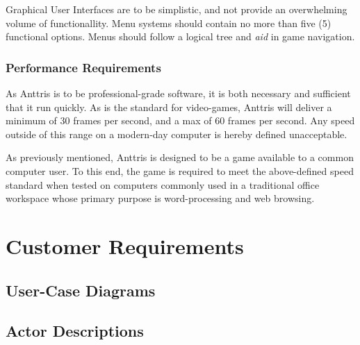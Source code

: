 \documentclass[12pt]{article}
\begin{document}
Graphical User Interfaces are to be simplistic, and not provide an overwhelming
volume of functionallity. Menu systems should contain no more than five (5)
functional options. Menus should follow a logical tree and \textsl{aid} in
game navigation.
\subsubsection{Performance Requirements}
As Anttris is to be professional-grade software, it is both necessary and
sufficient that it run quickly. As is the standard for video-games, Anttris
will deliver a minimum of 30 frames per second, and a max of 60 frames per
second. Any speed outside of this range on a modern-day computer is hereby
defined unacceptable.

As previously mentioned, Anttris is designed to be a game available to a common
computer user. To this end, the game is required to meet the above-defined
speed standard when tested on computers commonly used in a traditional office
workspace whose primary purpose is word-processing and web browsing.

\section{Customer Requirements}\label{cust-reqs-HR}
\subsection{User-Case Diagrams}
\subsection{Actor Descriptions}
\end{document}
